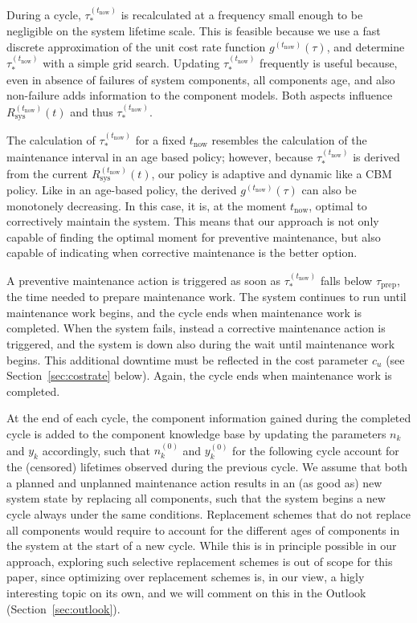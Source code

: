 \documentclass[authoryear]{elsarticle}
\newcommand{\uz}{^{(0)}} %
\def\ykz{y\uz_k}
\def\nkz{n\uz_k}
\def\yknow{y_k^{(\tnow)}}
\def\nknow{n_k^{(\tnow)}}
\newcommand{\nk}{n_k}
\newcommand{\yk}{y_k}
\def\tnow{t_\text{now}}
\def\tpnow{t^+_\text{now}}
\newcommand{\Rsysnow}{R^{(t_\text{now})}_\text{sys}}
\newcommand{\gnow}{g^{(\tnow)}}
\newcommand{\tausnow}{\tau_*^{(\tnow)}}
\newcommand{\tprep}{\tau_{\text{prep}}}
\begin{document}
During a cycle,
$\tausnow$ is recalculated at a frequency small enough to be negligible on the system lifetime scale.
This is feasible because we use a fast discrete approximation of the unit cost rate function $\gnow(\tau)$,
and determine $\tausnow$ with a simple grid search.
Updating $\tausnow$ frequently is useful because,
even in absence of failures of system components,
all components age, and also non-failure adds information to the component models.
Both aspects influence $\Rsysnow(t)$ and thus $\tausnow$.

The calculation of $\tausnow$ for a fixed $\tnow$ resembles the calculation
of the maintenance interval in an age based policy;
however, because $\tausnow$ is derived from the current $\Rsysnow(t)$,
our policy is adaptive and dynamic like a CBM policy. 
Like in an age-based policy, the derived $\gnow(\tau)$ can also be monotonely decreasing.
In this case, it is, at the moment $\tnow$, optimal to correctively maintain the system.
This means that our approach is not only capable of finding the optimal moment for preventive maintenance,
but also capable of indicating when corrective maintenance is the better option.

A preventive maintenance action is triggered as soon as $\tausnow$ falls below $\tprep$,
the time needed to prepare maintenance work.
The system continues to run until maintenance work begins,
and the cycle ends when maintenance work is completed.
When the system fails, instead a corrective maintenance action is triggered,
and the system is down also during the wait until maintenance work begins.
This additional downtime must be reflected in the cost parameter $c_u$ (see Section~\ref{sec:costrate} below).
Again, the cycle ends when maintenance work is completed.

At the end of each cycle,
the component information gained during the completed cycle is added to the component knowledge base
by updating the parameters $\nk$ and $\yk$ accordingly,
such that $\nkz$ and $\ykz$ for the following cycle account for the (censored) lifetimes observed during the previous cycle.
We assume that both a planned and unplanned maintenance action results in an (as good as) new system state by replacing all components,
such that the system begins a new cycle always under the same conditions.
Replacement schemes that do not replace all components would require to account for the different ages of components in the system
at the start of a new cycle.
While this is in principle possible in our approach,
exploring such selective replacement schemes is out of scope for this paper,
since optimizing over replacement schemes is, in our view, a higly interesting topic on its own,
and we will comment on this in the Outlook (Section~\ref{sec:outlook}).
\end{document}
